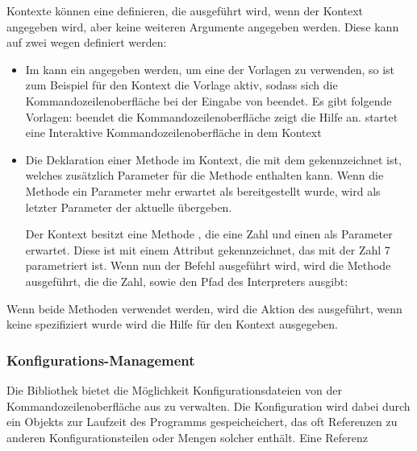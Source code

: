 Kontexte können eine  definieren, die ausgeführt wird, wenn der Kontext angegeben wird, aber keine weiteren Argumente angegeben werden.
Diese kann auf zwei wegen definiert werden:
\begin{itemize}
 \item Im  kann ein  angegeben werden, um eine der Vorlagen zu verwenden, 
 so ist zum Beispiel für den  Kontext die  Vorlage aktiv,
 sodass sich die Kommandozeilenoberfläche bei der Eingabe von  beendet.
 Es gibt folgende Vorlagen:
 \subitem {} beendet die Kommandozeilenoberfläche
 \subitem {} zeigt die Hilfe an.
 \subitem {} startet eine Interaktive Kommandozeilenoberfläche in dem Kontext 
 \item Die Deklaration einer Methode im Kontext, die mit dem  gekennzeichnet ist,
 welches zusätzlich Parameter für die Methode enthalten kann.
 Wenn die Methode ein Parameter mehr erwartet als bereitgestellt wurde, wird als letzter Parameter der aktuelle  übergeben.
 
 Der  Kontext besitzt eine Methode , die eine Zahl und einen  als Parameter erwartet.
 Diese ist mit einem  Attribut gekennzeichnet, das mit der Zahl 7 parametriert ist.
 Wenn nun der Befehl  ausgeführt wird, wird die  Methode ausgeführt, die die Zahl, sowie den Pfad des Interpreters ausgibt:
\end{itemize}
 Wenn beide Methoden verwendet werden, wird die Aktion des  ausgeführt, wenn keine spezifiziert wurde wird die Hilfe für den Kontext ausgegeben.

\subsubsection{Konfigurations-Management}\label{ConfigurationManagement}
Die Bibliothek bietet die Möglichkeit Konfigurationsdateien von der Kommandozeilenoberfläche aus zu verwalten.
Die Konfiguration wird dabei durch ein Objekts zur Laufzeit des Programms gespeicheichert, das oft Referenzen zu anderen Konfigurationsteilen oder Mengen solcher enthält.
Eine Referenz

